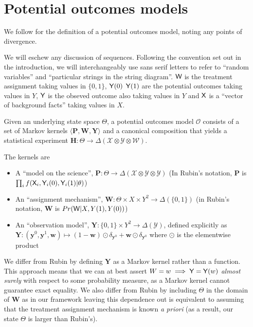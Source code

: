 
\section{Potential outcomes models}\label{sec:counterfactuals}

We follow \cite{rubin_causal_2005} for the definition of a potential outcomes model, noting any points of divergence. 

We will eschew any discussion of sequences. Following the convention set out in the introduction, we will interchangeably use sans serif letters to refer to ``random variables'' and ``particular strings in the string diagram''. $\mathsf{W}$ is the treatment assignment taking values in $\{0,1\}$, $\mathsf{Y}(0)$ $\mathsf{Y}(1)$ are the potential outcomes taking values in $Y$, $\mathsf{Y}$ is the obseved outcome also taking values in $Y$ and $\mathsf{X}$ is a ``vector of background facts'' taking values in $X$.

Given an underlying state space $\Theta$, a potential outcomes model $\mathscr{O}$ consists of a set of Markov kernels $\langle \mathbf{P}, \mathbf{W}, \mathbf{Y} \rangle$ and a canonical composition that yields a statistical experiment $\mathbf{H}:\Theta\to \Delta(\mathcal{X}\otimes\mathcal{Y}\otimes \mathcal{W})$. 

The kernels are
\begin{itemize}
\item A ``model on the science'', $\mathbf{P}:\Theta \to \Delta(\mathcal{X}\otimes\mathcal{Y}\otimes\mathcal{Y})$ (In Rubin's notation, $\mathbf{P}$ is $\prod_i f(\mathsf{X}_i,\mathsf{Y}_i(0),\mathsf{Y}_i(1)|\theta)$)
\item An ``assignment mechanism'', $\mathbf{W}:\Theta\times X\times Y^2 \to \Delta(\{0,1\})$ (in Rubin's notation, $\mathbf{W}$ is $Pr(\mathsf{W}|X,Y(1),Y(0))$)
\item An ``observation model'', $\mathbf{Y}:\{0,1\}\times Y^2\to \Delta(\mathcal{Y})$, defined explicitly as $\mathbf{Y}:(\mathbf{y}^0,\mathbf{y}^1,\mathbf{w})\mapsto (1-\mathbf{w}) \odot \delta_{\mathbf{y}^0} + \mathbf{w} \odot \delta_{\mathbf{y}^0}$ where $\odot$ is the elementwise product
\end{itemize}

We differ from Rubin by defining $\mathbf{Y}$ as a Markov kernel rather than a function. This approach means that we can at best assert $W=w\implies \mathsf{Y}=\mathsf{Y}(w)$ \emph{almost surely} with respect to some probability measure, as a Markov kernel cannot guarantee exact equality. We also differ from Rubin by including $\Theta$ in the domain of $\mathbf{W}$ as in our framework leaving this dependence out is equivalent to assuming that the treatment assignment mechanism is known \emph{a priori} (as a result, our state $\Theta$ is larger than Rubin's).

